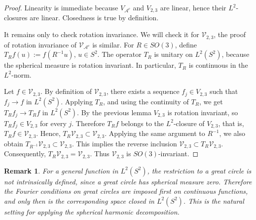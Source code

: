 \documentclass[11pt]{article}
\newtheorem{remark}[theorem]{Remark}
\theoremstyle{definition}
\begin{document}
\begin{proof}
	Linearity is immediate because  \(V_{{\mathcal A}^c} \) and \(V_{2,3}\) are  linear, hence their  \(L^2\)-closures are  linear.
	Closedness is true by definition.
	
	It remains only to check rotation invariance. We will check it for ${\mathcal V}_{2,3}$, the proof of rotation invariance of  $	{\mathcal V}_{{\mathcal A}^c}$ is similar.
	For \(R\in SO(3)\), define
	$
	T_R f(u):=f(R^{-1}u)$, $u\in S^2$.
	The operator \(T_R\) is unitary on \(L^2(S^2)\), because the spherical measure is rotation invariant. In particular, \(T_R\) is continuous in the \(L^2\)-norm.
	
	Let \(f\in {\mathcal V}_{2,3}\). By definition of \({\mathcal V}_{2,3}\), there exists a sequence \(f_j\in V_{2,3}\) such that
	$
	f_j\to f$ in $L^2(S^2)$.
	Applying \(T_R\), and using the continuity of \(T_R\), we get
	$
	T_R f_j\to T_R f$ in $L^2(S^2)$.
	By the previous lemma \(V_{2,3}\) is rotation invariant, so \(T_R f_j\in V_{2,3}\) for every \(j\). Therefore \(T_R f\) belongs to the \(L^2\)-closure of \(V_{2,3}\), that is,
	$T_R f\in {\mathcal V}_{2,3}$.
	Hence,
	$
	T_R {\mathcal V}_{2,3}\subset {\mathcal V}_{2,3}.
	$
	Applying the same argument to \(R^{-1}\), we also obtain
	$
	T_{R^{-1}}{\mathcal V}_{2,3}\subset {\mathcal V}_{2,3}.
	$
	This implies the reverse inclusion \({\mathcal V}_{2,3}\subset T_R{\mathcal V}_{2,3}\). Consequently,
	$
	T_R{\mathcal V}_{2,3}={\mathcal V}_{2,3}.
	$
	Thus \({\mathcal V}_{2,3}\) is \(SO(3)\)-invariant.
\end{proof}






\begin{remark}
	For a general function in
	\(L^2(S^2)\), the restriction to a great circle is not intrinsically defined, since a
	great circle has spherical measure zero. Therefore the Fourier conditions on great
	circles are imposed first on continuous functions, and only then is the corresponding
	space closed in \(L^2(S^2)\). This is the natural setting for applying the spherical
	harmonic decomposition.
\end{remark}
\end{document}
